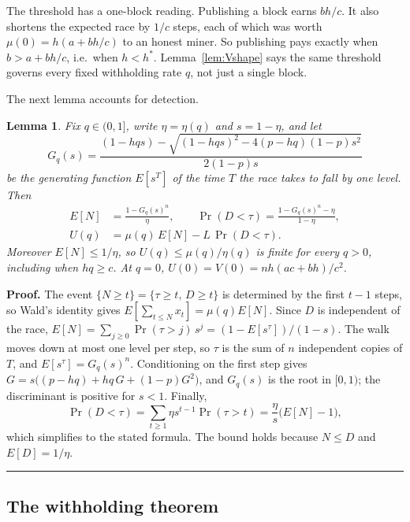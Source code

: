 \documentclass{article}%
\newtheorem{lemma}[theorem]{Lemma}
\newenvironment{proof}[1][Proof]{\noindent\textbf{#1.} }{\ \rule{0.5em}{0.5em}}
\begin{document}
The threshold has a one-block reading. Publishing a block earns $bh/c$. It
also shortens the expected race by $1/c$ steps, each of which was worth
$\mu(0)=h(a+bh/c)$ to an honest miner. So publishing pays exactly when
$b>a+bh/c$, i.e.\ when $h<h^{\ast}$. Lemma~\ref{lem:Vshape} says the same
threshold governs every fixed withholding rate $q$, not just a single block.

The next lemma accounts for detection.

\begin{lemma}
\label{lem:caught}Fix $q\in(0,1]$, write $\eta=\eta(q)$ and $s=1-\eta$, and
let
\[
G_{q}(s)=\frac{(1-hqs)-\sqrt{(1-hqs)^{2}-4(p-hq)(1-p)s^{2}}}{2(1-p)s}%
\]
be the generating function $E[s^{T}]$ of the time $T$ the race takes to fall
by one level. Then%
\begin{align}
E[N]  &  =\frac{1-G_{q}(s)^{n}}{\eta},\qquad\Pr(D<\tau)=\frac{1-G_{q}%
(s)^{n}-\eta}{1-\eta},\nonumber\\
U(q)  &  =\mu(q)\,E[N]-L\,\Pr(D<\tau). \label{Ucaught}%
\end{align}
Moreover $E[N]\leq1/\eta$, so $U(q)\leq\mu(q)/\eta(q)$ is finite for every
$q>0$, including when $hq\geq c$. At $q=0$, $U(0)=V(0)=nh(ac+bh)/c^{2}$.
\end{lemma}

\begin{proof}
The event $\{N\geq t\}=\{\tau\geq t,\,D\geq t\}$ is determined by the first
$t-1$ steps, so Wald's identity gives $E[\sum_{t\leq N}x_{t}]=\mu(q)E[N]$.
Since $D$ is independent of the race,
$E[N]=\sum_{j\geq0}\Pr(\tau>j)\,s^{j}=(1-E[s^{\tau}])/(1-s)$. The walk moves
down at most one level per step, so $\tau$ is the sum of $n$ independent
copies of $T$, and $E[s^{\tau}]=G_{q}(s)^{n}$. Conditioning on the first step
gives $G=s\bigl((p-hq)+hq\,G+(1-p)G^{2}\bigr)$, and $G_{q}(s)$ is the root in
$[0,1)$; the discriminant is positive for $s<1$. Finally,
\[
\Pr(D<\tau)=\sum_{t\geq1}\eta s^{t-1}\Pr(\tau>t)=\frac{\eta}{s}\bigl(E[N]-1\bigr),
\]
which simplifies to the stated formula. The bound holds because $N\leq D$
and $E[D]=1/\eta$.
\end{proof}

\subsection{The withholding theorem}
\end{document}
